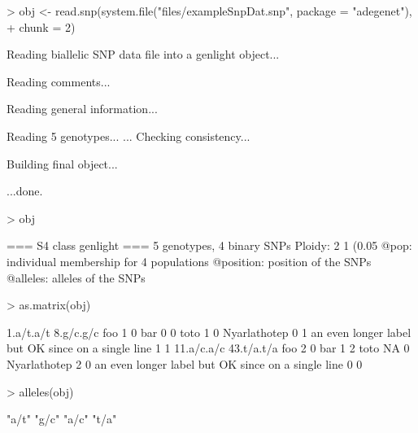 \documentclass{article}
\begin{document}
\begin{Schunk}
\begin{Sinput}
> obj <- read.snp(system.file("files/exampleSnpDat.snp", package = "adegenet"), 
+     chunk = 2)
\end{Sinput}
\begin{Soutput}
 Reading biallelic SNP data file into a genlight object... 


 Reading comments... 

 Reading general information... 

 Reading 5 genotypes... 
...
 Checking consistency... 

 Building final object... 

...done.
\end{Soutput}
\begin{Sinput}
> obj
\end{Sinput}
\begin{Soutput}
 === S4 class genlight ===
 5 genotypes,  4 binary SNPs
 Ploidy: 2
 1 (0.05 %
 @pop: individual membership for 4 populations
 @position: position of the SNPs
 @alleles: alleles of the SNPs
\end{Soutput}
\begin{Sinput}
> as.matrix(obj)
\end{Sinput}
\begin{Soutput}
                                                   1.a/t.a/t 8.g/c.g/c
foo                                                        1         0
bar                                                        0         0
toto                                                       1         0
Nyarlathotep                                               0         1
an even longer label but OK since on a single line         1         1
                                                   11.a/c.a/c 43.t/a.t/a
foo                                                         2          0
bar                                                         1          2
toto                                                       NA          0
Nyarlathotep                                                2          0
an even longer label but OK since on a single line          0          0
\end{Soutput}
\begin{Sinput}
> alleles(obj)
\end{Sinput}
\begin{Soutput}
[1] "a/t" "g/c" "a/c" "t/a"
\end{Soutput}
\begin{Sinput}

\end{Sinput}
\end{Schunk}
\end{document}
